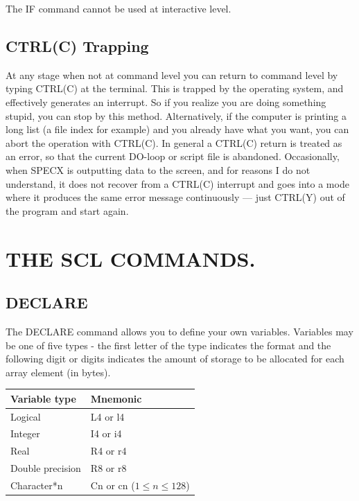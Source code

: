 \documentclass[11pt,twoside]{report}
\begin{document}
The IF command cannot be used at interactive level.

\subsection{CTRL(C) Trapping}

At any stage when not at command level you can return to command level
by typing CTRL(C) at the terminal. This is trapped by the operating system,
and effectively generates an interrupt. So if you realize you are doing
something stupid, you can stop by this method. Alternatively, if the computer
is printing a long list (a file index for example) and you already have what
you want, you can abort the operation with CTRL(C). In general a CTRL(C) return is
treated as an error, so that the current DO-loop or script file is
abandoned. Occasionally, when SPECX is outputting data to the screen, and for
reasons I do not understand, it does not recover from a CTRL(C) interrupt
and goes into a mode where it produces the same error message continuously ---
just CTRL(Y) out of the program and start again.

\section{THE SCL COMMANDS.}

\subsection{DECLARE}

The DECLARE command allows you to define your own variables. Variables may be
one of five types - the first letter of the type indicates the format and the
following digit or digits indicates the amount of storage to be allocated for
each array element (in bytes).

\begin{center}
\begin{tabular}{|l|l|}  \hline
Variable type & Mnemonic \\
\hline
Logical & L4 or l4 \\
Integer & I4 or i4 \\
Real    & R4 or r4 \\
Double precision & R8 or r8 \\
Character*n & Cn or cn ($1\leq n\leq128$)\\ \hline
\end{tabular}
\end{center}
\end{document}

